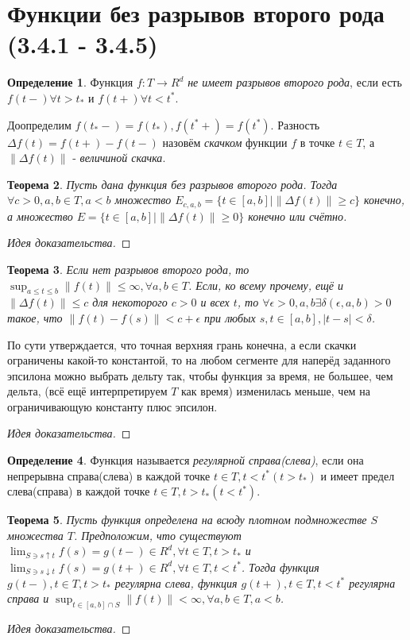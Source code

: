 \documentclass[16pt]{article}
\newtheorem{theorem}{Теорема}[section]
\theoremstyle{definition}
\newtheorem{definition}[theorem]{Определение}
\begin{document}
\section{Функции без разрывов второго рода (3.4.1 - 3.4.5)}
\begin{definition}
Функция $f: T \rightarrow R^d$ \textit{не имеет разрывов второго рода}, если есть $f(t-) \forall t > t_*$ и $f(t+) \forall t < t^*$.
\end{definition}
Доопределим $f(t_*-) = f(t_*), f(t^*+)=f(t^*)$. Разность $\Delta f(t) = f(t+) - f(t-)$ назовём \textit{скачком} функции $f$ в точке $t \in T$, а $\|\Delta f(t)\|$ - \textit{величиной скачка}.
\begin{theorem}
Пусть дана функция без разрывов второго рода. Тогда $\forall c > 0, a, b \in T, a < b$ множество $E_{c, a, b} = \{t \in [a, b] \mid \|\Delta f(t)\| \ge c\}$ конечно, а множество $E = \{t \in [a, b] \mid \|\Delta f(t)\| \ge 0\}$ конечно или счётно.
\end{theorem}
\begin{proof}[Идея доказательства]

\end{proof}
\begin{theorem}
Если нет разрывов второго рода, то $\sup_{a \le t \le b} \|f(t)\| \le \infty, \forall a, b \in T$. Если, ко всему прочему, ещё и $\|\Delta f(t)\| \le c$ для некоторого $c > 0$ и всех $t$, то $\forall \epsilon > 0, a, b \exists \delta(\epsilon, a, b) > 0$ такое, что $\|f(t) - f(s)\| < c + \epsilon$ при любых $s, t \in [a, b], |t - s| < \delta$.
\end{theorem}
По сути утверждается, что точная верхняя грань конечна, а если скачки ограничены какой-то константой, то на любом сегменте для наперёд заданного эпсилона можно выбрать дельту так, чтобы функция за время, не большее, чем дельта, (всё ещё интерпретируем $T$ как время) изменилась меньше, чем на ограничивающую константу плюс эпсилон.
\begin{proof}[Идея доказательства]

\end{proof}
\begin{definition}
Функция называется \textit{регулярной справа(слева)}, если она непрерывна справа(слева) в каждой точке $t \in T, t < t^* (t > t_*)$ и имеет предел слева(справа) в каждой точке $t \in T, t > t_* (t < t^*)$. 
\end{definition}
\begin{theorem}
Пусть функция определена на всюду плотном подмножестве $S$ множества $T$. Предположим, что существуют $\lim_{S \ni s \uparrow t} f(s) = g(t-) \in R^d, \forall t \in T, t > t_*$ и $\lim_{S \ni s \downarrow t} f(s) = g(t+) \in R^d, \forall t \in T, t < t^*$. Тогда функция $g(t-), t \in T, t > t_*$ регулярна слева, функция $g(t+), t \in T, t < t^*$ регулярна справа и $\sup_{t \in [a, b] \cap S} \|f(t)\| < \infty, \forall a, b \in T, a < b$.
\end{theorem}
\begin{proof}[Идея доказательства]

\end{proof}
\end{document}
